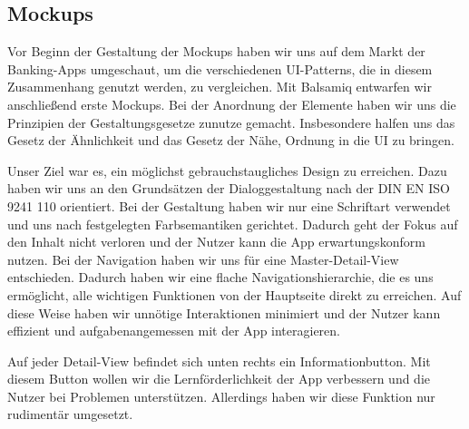 
\subsection{Mockups}
	Vor Beginn der Gestaltung der Mockups haben wir uns auf dem Markt der Banking-Apps umgeschaut, um die verschiedenen UI-Patterns, die in diesem Zusammenhang genutzt werden, zu vergleichen. Mit Balsamiq entwarfen wir anschließend erste Mockups. Bei der Anordnung der Elemente haben wir uns die Prinzipien der Gestaltungsgesetze zunutze gemacht. Insbesondere halfen uns das Gesetz der Ähnlichkeit und das Gesetz der Nähe, Ordnung in die UI zu bringen. 

	Unser Ziel war es, ein möglichst gebrauchstaugliches Design zu erreichen. Dazu haben wir uns an den Grundsätzen der Dialoggestaltung nach der DIN EN ISO 9241 110 \citep{DIN9241} orientiert. Bei der Gestaltung haben wir nur eine Schriftart verwendet und uns nach festgelegten Farbsemantiken gerichtet. Dadurch geht der Fokus auf den Inhalt nicht verloren und der Nutzer kann die App erwartungskonform nutzen. Bei der Navigation haben wir uns für eine Master-Detail-View entschieden. Dadurch haben wir eine flache Navigationshierarchie, die es uns ermöglicht, alle wichtigen Funktionen von der Hauptseite direkt zu erreichen. Auf diese Weise haben wir unnötige Interaktionen minimiert und der Nutzer kann effizient und aufgabenangemessen mit der App interagieren.  

	Auf jeder Detail-View befindet sich unten rechts ein Informationbutton. Mit diesem Button wollen wir die Lernförderlichkeit der App verbessern und die Nutzer bei Problemen unterstützen. Allerdings haben wir diese Funktion nur rudimentär umgesetzt.
	
